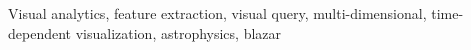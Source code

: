 {\begin{abstract}
\end{abstract}

\begin{IEEEkeywords}
Visual analytics, feature extraction, visual query, multi-dimensional, time-dependent visualization, astrophysics, blazar
\end{IEEEkeywords}}